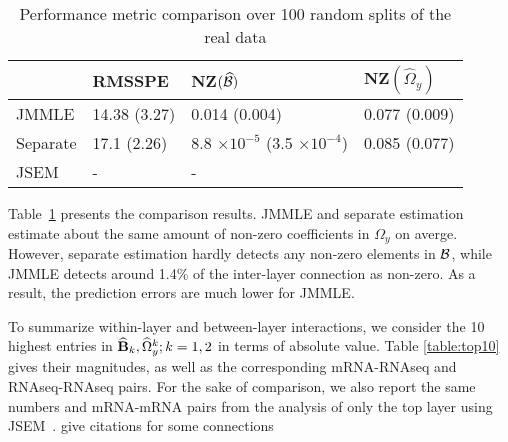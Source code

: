 \begin{table}[t]
\centering
    \begin{tabular}{llll}
    \hline
~        & RMSSPE        & NZ$(\widehat {{\cal{B}}})$  & NZ$(\widehat \Omega_y)$  \\\hline
JMMLE    & 14.38 (3.27) & 0.014 (0.004) & 0.077 (0.009) \\
Separate & 17.1 (2.26)  & 8.8 $\times 10^{-5}$ (3.5 $\times 10^{-4}$) & 0.085 (0.077) \\
JSEM     & -            & -             & ~             \\\hline
    \end{tabular}
    \caption{Performance metric comparison over 100 random splits of the real data}
    \label{table:real-compare}
\end{table}
%
Table~\ref{table:real-compare} presents the comparison results. JMMLE and separate estimation estimate about the same amount of non-zero coefficients in $\Omega_y$ on averge. However, separate estimation hardly detects any non-zero elements in ${\cal{B}}$, while JMMLE detects around 1.4\% of the inter-layer connection as non-zero. As a result, the prediction errors are much lower for JMMLE.

To summarize within-layer and between-layer interactions, we consider the 10 highest entries in $\widehat {{\mathbf{B}}}_k, \widehat \Omega_y^k; k = 1,2$ in terms of absolute value. Table \ref{table:top10} gives their magnitudes, as well as the corresponding mRNA-RNAseq and RNAseq-RNAseq pairs. For the sake of comparison, we also report the same numbers and mRNA-mRNA pairs from the analysis of only the top layer using JSEM~\citep{MaMichailidis15}. {\colrbf give citations for some connections}

